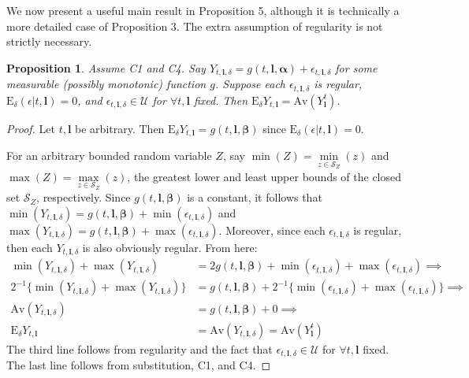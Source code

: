 \documentclass[12pt]{amsart}
\theoremstyle{plain}%
\newtheorem{proposition}{Proposition}
\theoremstyle{definition}
\theoremstyle{remark}
\numberwithin{equation}{section}
\begin{document}
We now present a useful main result in Proposition 5, although it is technically a more detailed case of Proposition 3. The extra assumption of regularity is not strictly necessary.
\begin{proposition}
Assume C1 and C4. Say $Y_{t, \mathbf{l}, \delta} = g(t, \mathbf{l}, \boldsymbol{\alpha}) + \epsilon_{t, \mathbf{l}, \delta}$ for some measurable (possibly monotonic) function $g$. Suppose each $\epsilon_{t, \mathbf{l}, \delta}$ is regular, $\text{E}_{\delta}(\epsilon | t, \mathbf{l}) = 0$, and $\epsilon_{t, \mathbf{l}, \delta} \in \mathcal{U}$ for $\forall t, \mathbf{l}$ fixed. Then $\text{E}_{\delta}Y_{t, \mathbf{l}} = \text{Av}(Y_{\mathbf{l}}^{t})$.
\end{proposition}
\begin{proof}
Let $t, \mathbf{l}$ be arbitrary. Then $\text{E}_{\delta}Y_{t, \mathbf{l}} = g(t, \mathbf{l}, \boldsymbol{\beta})$ since $\text{E}_{\delta}(\epsilon | t, \mathbf{l}) = 0$.

For an arbitrary bounded random variable $Z$, say $\min (Z) = \underset{z \in \mathcal{S}_Z}{\min}(z)$ and $\max (Z) =  \underset{z \in \mathcal{S}_Z}{\max}(z)$, the greatest lower and least upper bounds of the closed set $\mathcal{S}_Z$, respectively. Since $g(t, \mathbf{l}, \boldsymbol{\beta})$ is a constant, it follows that $\min (Y_{t, \mathbf{l}, \delta}) =  g(t, \mathbf{l}, \boldsymbol{\beta}) + \min (\epsilon_{t, \mathbf{l}, \delta})$ and $\max (Y_{t, \mathbf{l}, \delta}) =  g(t, \mathbf{l}, \boldsymbol{\beta}) + \max (\epsilon_{t, \mathbf{l}, \delta})$. Moreover, since each $\epsilon_{t, \mathbf{l}, \delta}$ is regular, then each $Y_{t, \mathbf{l}, \delta}$ is also obviously regular.
From here:
\begin{align*}
\min (Y_{t, \mathbf{l}, \delta}) + \max (Y_{t, \mathbf{l}, \delta}) & = 2 g(t, \mathbf{l}, \boldsymbol{\beta}) + \min (\epsilon_{t, \mathbf{l}, \delta}) + \max (\epsilon_{t, \mathbf{l}, \delta}) \implies \\
2^{-1} \{ \min (Y_{t, \mathbf{l}, \delta}) + \max (Y_{t, \mathbf{l}, \delta}) \} & = g(t, \mathbf{l}, \boldsymbol{\beta}) + 2^{-1} \{ \min (\epsilon_{t, \mathbf{l}, \delta}) + \max (\epsilon_{t, \mathbf{l}, \delta}) \} \implies \\
\text{Av}(Y_{t, \mathbf{l}, \delta}) & = g(t, \mathbf{l}, \boldsymbol{\beta}) + 0 \implies \\
\text{E}_{\delta}Y_{t, \mathbf{l}} & = \text{Av}(Y_{t, \mathbf{l}, \delta}) =  \text{Av}(Y_{\mathbf{l}}^{t})
\end{align*}
The third line follows from regularity and the fact that $\epsilon_{t, \mathbf{l}, \delta} \in \mathcal{U}$ for $\forall t, \mathbf{l}$ fixed. The last line follows from substitution, C1, and C4.
\end{proof}
\end{document}
